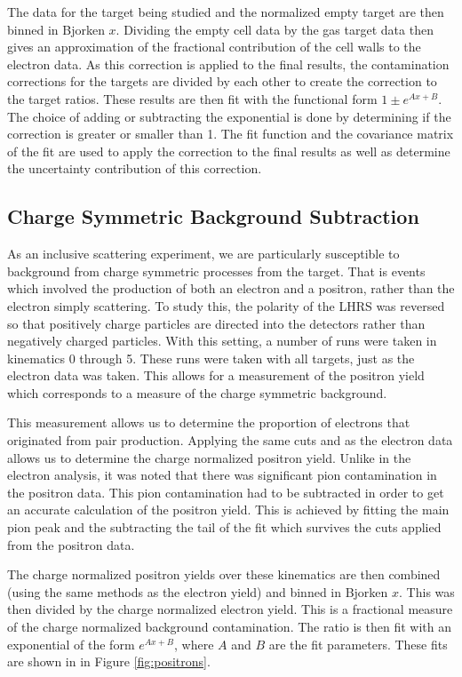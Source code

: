 The data for the target being studied and the normalized empty target are then binned in Bjorken $x$. Dividing the empty cell data by the gas target data then gives an approximation of the fractional contribution of the cell walls to the electron data. As this correction is applied to the final results, the contamination corrections for the targets are divided by each other to create the correction to the target ratios. These results are then fit with the functional form $1\pm e^{Ax+B}$. The choice of adding or subtracting the exponential is done by determining if the correction is greater or smaller than 1. The fit function and the covariance matrix of the fit are used to apply the correction to the final results as well as determine the uncertainty contribution of this correction.

\subsection{Charge Symmetric Background Subtraction}

As an inclusive scattering experiment, we are particularly susceptible to background from charge symmetric processes from the target. That is events which involved the production of both an electron and a positron, rather than the electron simply scattering. To study this, the polarity of the LHRS was reversed so that positively charge particles are directed into the detectors rather than negatively charged particles. With this setting, a number of runs were taken in kinematics 0 through 5. These runs were taken with all targets, just as the electron data was taken. This allows for a measurement of the positron yield which corresponds to a measure of the charge symmetric background.

This measurement allows us to determine the proportion of electrons that originated from pair production. Applying the same cuts and as the electron data allows us to determine the charge normalized positron yield. Unlike in the electron analysis, it was noted that there was significant pion contamination in the positron data. This pion contamination had to be subtracted in order to get an accurate calculation of the positron yield. This is achieved by fitting the main pion peak and the subtracting the tail of the fit which survives the cuts applied from the positron data.

The charge normalized positron yields over these kinematics are then combined (using the same methods as the electron yield) and binned in Bjorken $x$. This was then divided by the charge normalized electron yield. This is a fractional measure of the charge normalized background contamination. The ratio is then fit with an exponential of the form $e^{Ax + B}$, where $A$ and $B$ are the fit parameters. These fits are shown in in Figure \ref{fig:positrons}.

